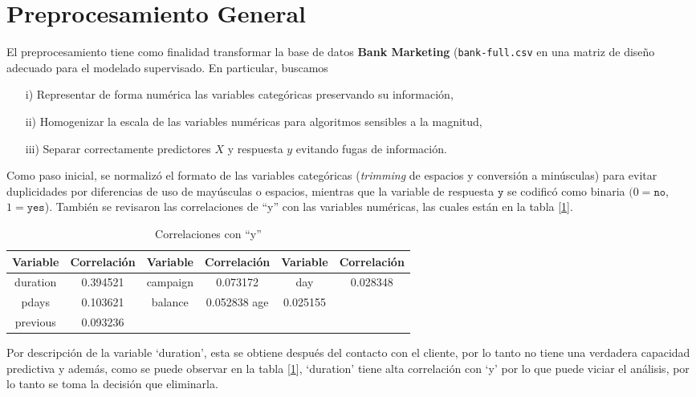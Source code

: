 \documentclass[10pt]{article}
\begin{document}
\section{Preprocesamiento General}
El preprocesamiento tiene como finalidad transformar la base de datos \textbf{Bank Marketing} (\texttt{bank-full.csv} en una matriz de diseño adecuado para el modelado supervisado. En particular, buscamos
\begin{itemize}
    \item[i)] Representar de forma numérica las variables categóricas preservando su información, 
    \item[ii)] Homogenizar la escala de las variables numéricas para algoritmos sensibles a la magnitud, 
    \item[iii)] Separar correctamente predictores $X$ y respuesta $y$ evitando fugas de información. 
\end{itemize}

Como paso inicial, se normalizó el formato de las variables categóricas (\textit{trimming} de espacios y conversión a minúsculas) para evitar duplicidades por diferencias de uso de mayúsculas o espacios, mientras que la variable de respuesta \(\texttt{y}\) se codificó como binaria $(0=\texttt{no}$, $1=\texttt{yes}$). También se revisaron las correlaciones de ``y'' con las variables numéricas, las cuales están en la tabla [\ref{tab:correlaciones numericas}]. \\

\begin{table}[h!]
\centering
\caption{Correlaciones con ``y''}
\label{tab:correlaciones numericas}
\begin{tabular}{cc|cc|cc}
\toprule
\textbf{Variable}  & \textbf{Correlación} &\textbf{Variable}  & \textbf{Correlación}&\textbf{Variable}  & \textbf{Correlación} \\
\midrule
duration   & 0.394521 & campaign   & 0.073172  & day  & 0.028348 \\
pdays      & 0.103621 & balance    & 0.052838  age    & 0.025155   \\
previous   & 0.093236 &         & & & \\
\bottomrule
\end{tabular}
\end{table}








Por descripción de la variable `duration', esta se obtiene después del contacto con el cliente, por lo tanto no tiene una verdadera capacidad predictiva y además, como se puede observar en la tabla [\ref{tab:correlaciones numericas}], `duration' tiene alta correlación con `y' por lo que puede viciar el análisis, por lo tanto se toma la decisión que eliminarla.\\
\end{document}
